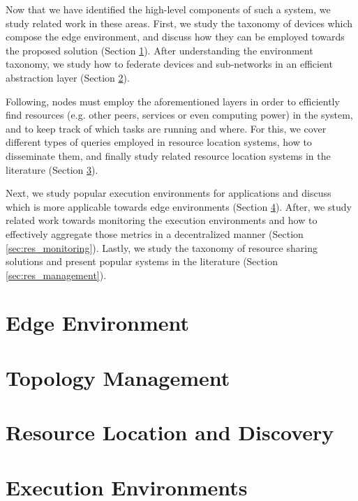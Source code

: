Now that we have identified the high-level components of such a system, we study related work in these areas. First, we study the taxonomy of devices which compose the edge environment, and discuss how they can be employed towards the proposed solution (Section \ref{sec:edge_computing}). After understanding the environment taxonomy, we study how to federate devices and sub-networks in an efficient abstraction layer (Section \ref{sec:topology_management}).

Following, nodes must employ the aforementioned layers in order to efficiently find resources (e.g. other peers, services or even computing power) in the system, and to keep track of which tasks are running and where. For this, we cover different types of queries employed in resource location systems, how to disseminate them, and finally study related resource location systems in the  literature (Section \ref{sec:res_location}).

Next, we study popular execution environments for applications and discuss which is more applicable towards edge environments (Section \ref{sec:runtime_environments}). After, we study related work towards monitoring the execution environments and how to effectively aggregate those metrics in a decentralized manner (Section \ref{sec:res_monitoring}).  Lastly, we study the taxonomy of resource sharing solutions and present popular systems in the literature (Section \ref{sec:res_management}). 

\section{Edge Environment} \label{sec:edge_computing} 

\section{Topology Management} \label{sec:topology_management} 

\section{Resource Location and Discovery} \label{sec:res_location} 

\section{Execution Environments} \label{sec:runtime_environments} 

